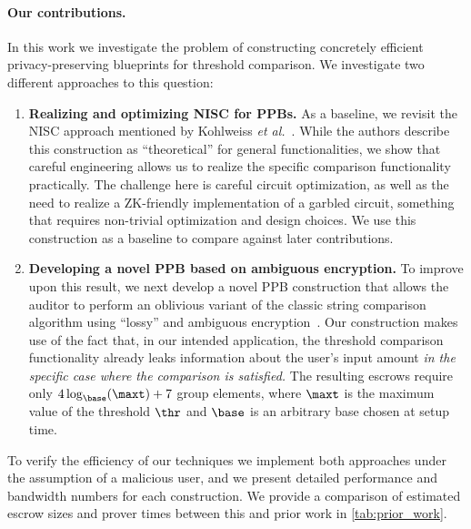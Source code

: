 \paragraph{Our contributions.} In this work we investigate the problem of constructing concretely efficient privacy-preserving blueprints for threshold comparison. We investigate two different approaches to this question:
\begin{enumerate}
	\item {\bf Realizing and optimizing NISC for PPBs.} As a baseline, we revisit the NISC approach mentioned by Kohlweiss \emph{et al.}~\cite{EC:KohLysNgu23}. While the authors describe this construction as ``theoretical'' for general functionalities, we show that careful engineering allows us to realize the specific comparison functionality practically. The challenge here is careful circuit optimization, as well as the need to realize a ZK-friendly implementation of a garbled circuit, something that requires non-trivial optimization and design choices. We use this construction as a baseline to compare against later contributions.

	\item {\bf Developing a novel PPB based on ambiguous encryption.}
	      To improve upon this result, we next develop a novel PPB construction that allows the auditor to perform an oblivious variant of the classic string comparison algorithm using ``lossy'' and ambiguous encryption~\cite{CCS:BLMG21}.
	      Our construction makes use of the fact that, in our intended application, the threshold comparison functionality already leaks information about the user's input amount \emph{in the specific case where the comparison is satisfied.}
	      The resulting escrows require only $4\log_{\base}(\maxt) + 7$ group elements, where $\maxt$ is the maximum value of the threshold $\thr$ and $\base$ is an arbitrary base chosen at setup time.
\end{enumerate}
To verify the efficiency of our techniques we implement both approaches under the assumption of a malicious user, and we present detailed performance and bandwidth numbers for each construction. We provide a comparison of estimated escrow sizes and prover times between this and prior work in \cref{tab:prior_work}.

